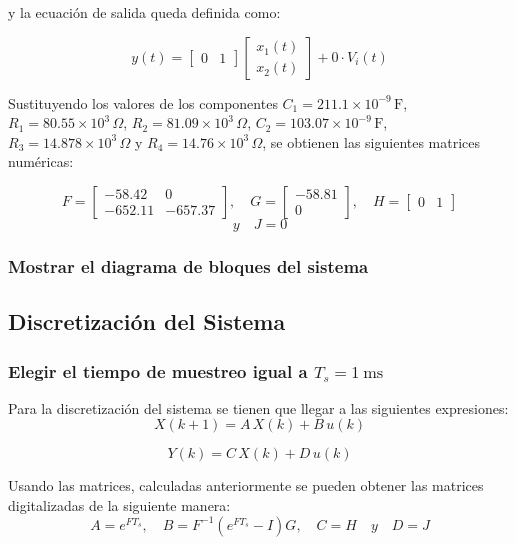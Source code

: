 y la ecuación de salida queda definida como:

\[
y(t) =
\begin{bmatrix}
	0 & 1
\end{bmatrix}
\begin{bmatrix}
	x_1(t) \\[4pt]
	x_2(t)
\end{bmatrix}
+ 0\cdot V_i(t)
\]

Sustituyendo los valores de los componentes 
$C_1 = 211.1\times10^{-9}\,\text{F}$, 
$R_1 = 80.55\times10^{3}\,\Omega$, 
$R_2 = 81.09\times10^{3}\,\Omega$, 
$C_2 = 103.07\times10^{-9}\,\text{F}$, 
$R_3 = 14.878\times10^{3}\,\Omega$ y 
$R_4 = 14.76\times10^{3}\,\Omega$, 
se obtienen las siguientes matrices numéricas:

\[
F =
\begin{bmatrix}
	-58.42 & 0 \\[4pt]
	-652.11 & -657.37
\end{bmatrix}, \quad
G =
\begin{bmatrix}
	-58.81 \\[4pt]
	0
\end{bmatrix}, \quad
H =
\begin{bmatrix}
	0 & 1
\end{bmatrix}
\]
\[
y \quad
J = 0
\]
\subsubsection{Mostrar el diagrama de bloques del sistema}


\subsection{Discretización del Sistema}

\subsubsection{Elegir el tiempo de muestreo igual a $T_s = 1~\text{ms}$}
Para la discretización del sistema se tienen que llegar a las siguientes expresiones:
\begin{equation}
	X(k+1) = A\,X(k) + B\,u(k)
	\label{eq:3}
\end{equation}

\begin{equation}
	Y(k) = C\,X(k) + D\,u(k)
	\label{eq:4}
\end{equation}

Usando las matrices, calculadas anteriormente se pueden obtener las matrices digitalizadas de la siguiente manera: 
\[
A=e^{FT_s}, \quad B=F^{-1}(e^{FT_s}-I)G, \quad C = H \quad y \quad D = J
\]

